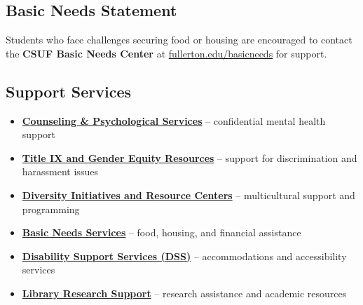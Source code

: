 \documentclass[12pt]{article}
\begin{document}
\subsection*{Basic Needs Statement}
Students who face challenges securing food or housing are encouraged to contact the \textbf{CSUF Basic Needs Center} at \href{https://www.fullerton.edu/basicneeds}{fullerton.edu/basicneeds} for support.

\subsection*{Support Services}
\begin{itemize}
\item \textbf{\href{https://www.fullerton.edu/caps/}{Counseling \& Psychological Services}} -- confidential mental health support
\item \textbf{\href{https://www.fullerton.edu/titleix/}{Title IX and Gender Equity Resources}} -- support for discrimination and harassment issues
\item \textbf{\href{https://www.fullerton.edu/dirc/}{Diversity Initiatives and Resource Centers}} -- multicultural support and programming
\item \textbf{\href{https://www.fullerton.edu/basicneeds/}{Basic Needs Services}} -- food, housing, and financial assistance
\item \textbf{\href{https://www.fullerton.edu/dss/}{Disability Support Services (DSS)}} -- accommodations and accessibility services
\item \textbf{\href{https://www.library.fullerton.edu/}{Library Research Support}} -- research assistance and academic resources
\end{itemize}
\end{document}
